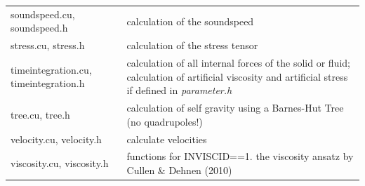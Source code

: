 \documentclass[10pt,fleqn,twoside]{article}
\begin{document}
\begin{table}
\begin{tabular}[b]{p{6cm} p{9cm}}
  soundspeed.cu, soundspeed.h                                   & calculation of the soundspeed                                                                                                                                                                                                                                                                                                                              \\
  stress.cu, stress.h                                           & calculation of the stress tensor                                                                                                                                                                                                                                                                                                                           \\
  timeintegration.cu, timeintegration.h                         & calculation of all internal forces of the solid or fluid; calculation of artificial viscosity and artificial stress if defined in \emph{parameter.h}                                                                                                                                                                                                       \\
  tree.cu, tree.h                                               & calculation of self gravity using a Barnes-Hut Tree (no quadrupoles!)                                                                                                                                                                                                                                                                                      \\
  velocity.cu, velocity.h                                       & calculate velocities                                                                                                                                                                                                                                                                                                                                       \\
  viscosity.cu, viscosity.h                                     & functions for INVISCID==1. the viscosity ansatz by Cullen \& Dehnen (2010)                                                                                                                                                                                                                                                                                 \\

\end{tabular}
\end{table}
\end{document}
